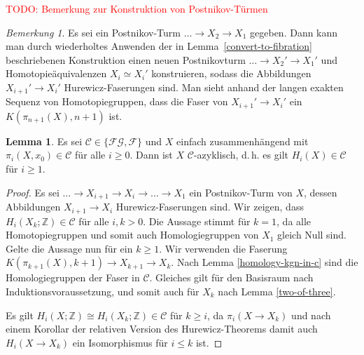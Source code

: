 \documentclass[11pt, a4paper, german]{article}
\theoremstyle{definition}
\newtheorem{lem}{Lemma}
\theoremstyle{remark}
\newtheorem*{bem}{Bemerkung}
\newcommand{\TODO}[1]{\textcolor{red}{TODO: #1}} %
\newcommand{\Z}{\mathbb{Z}} %
\newcommand{\SC}{\mathcal{C}} %
\newcommand{\FG}{\mathcal{FG}} %
\newcommand{\F}{\mathcal{F}} %
\renewcommand{\dh}{d.\,h.} %
\begin{document}
\TODO{Bemerkung zur Konstruktion von Postnikov-Türmen}

\begin{bem}
  Es sei ein Postnikov-Turm $\ldots \to X_2 \to X_1$ gegeben.
  Dann kann man durch wiederholtes Anwenden der in Lemma~\ref{convert-to-fibration} beschriebenen Konstruktion einen neuen Postnikovturm $\ldots \to X_2' \to X_1'$ und Homotopieäquivalenzen $X_i \simeq X_i'$ konstruieren, sodass die Abbildungen $X_{i+1}' \to X_i'$ Hurewicz-Faserungen sind.
  Man sieht anhand der langen exakten Sequenz von Homotopiegruppen, dass die Faser von $X_{i+1}' \to X_i'$ ein $K(\pi_{n+1}(X), n{+}1)$ ist.
\end{bem}

\begin{lem}\label{homotopy-in-c-implies-homology-in-c}
  Es sei $\SC \in \{ \FG, \F \}$ und
  $X$ einfach zusammenhängend mit $\pi_i(X, x_0) \in \SC$ für alle $i \geq 0$.
  Dann ist $X$ $\SC$-azyklisch, \dh{} es gilt $H_i(X) \in \SC$ für $i \geq 1$.
\end{lem}

\begin{proof}
  Es sei $\ldots \to X_{i+1} \to X_i \to \ldots \to X_1$ ein Postnikov-Turm von $X$, dessen Abbildungen $X_{i+1} \to X_i$ Hurewicz-Faserungen sind.
  Wir zeigen, dass $H_i(X_k; \Z) \in \SC$ für alle $i, k > 0$.
  Die Aussage stimmt für $k = 1$, da alle Homotopiegruppen und somit auch Homologiegruppen von $X_1$ gleich Null sind.
  Gelte die Aussage nun für ein $k \geq 1$.
  Wir verwenden die Faserung $K(\pi_{k+1}(X), k{+}1) \to X_{k+1} \to X_k$.
  Nach Lemma \ref{homology-kgn-in-c} sind die Homologiegruppen der Faser in $\SC$.
  Gleiches gilt für den Basisraum nach Induktionsvoraussetzung,
  und somit auch für $X_k$ nach Lemma \ref{two-of-three}.

  Es gilt $H_i(X; \Z) \cong H_i(X_k; \Z) \in \SC$ für $k \geq i$, da $\pi_i(X \to X_k)$ und nach einem Korollar der relativen Version des Hurewicz-Theorems damit auch $H_i(X \to X_k)$ ein Isomorphismus für $i \leq k$ ist.
\end{proof}
\end{document}
